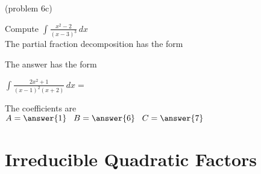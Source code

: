 \documentclass[handout]{ximera}
\begin{document}
\begin{problem}(problem 6c)

Compute $\displaystyle{\int \frac{x^2 - 2}{(x-3)^3}\, dx}$\\

The partial fraction decomposition has the form

\begin{multipleChoice}
\end{multipleChoice}

The answer has the form

$\displaystyle{\int \frac{2x^2 + 1}{(x-1)^2(x+2)} \, dx =}$

\begin{multipleChoice}
\end{multipleChoice}

The coefficients are\\

$A = \answer{1} \;\;\; B = \answer{6} \;\;\; C = \answer{7}$

\end{problem}




\section{Irreducible Quadratic Factors}
\end{document}

